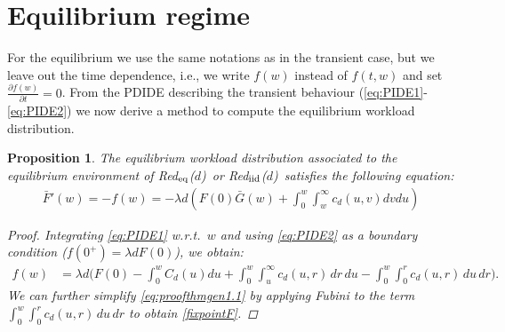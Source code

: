 \documentclass[12pt]{report}
\newcommand{\Redid}{Red$_{\textup{eq}}$($d$)}
\newcommand{\Redind}{Red$_{\textup{iid}}$($d$)}
\newtheorem{proposition}[theorem]{Proposition}
\begin{document}
\section{Equilibrium regime}\label{sec:equil_Redd}
For the equilibrium we use the same notations as in the transient case, but we leave out the time dependence, i.e., we write $f(w)$ instead of $f(t,w)$ and set $\frac{\partial f(w)}{\partial t} = 0$. From the PDIDE describing the transient behaviour (\ref{eq:PIDE1}-\ref{eq:PIDE2}) we now derive a method to compute the equilibrium workload distribution.
\begin{proposition}\label{thm:gen1}
The equilibrium workload distribution associated to the equilibrium environment of \Redid\ or \Redind\ satisfies the following equation:
\begin{align}
\bar{F}'(w)
=-f(w)
= - \lambda d \left( F(0) \bar{G}(w) + \int_0^w \int_w^\infty c_d(u,v) dv du \right) \label{fixpointF}
\end{align}
\begin{proof}
Integrating \eqref{eq:PIDE1} w.r.t.~$w$ and using \eqref{eq:PIDE2} as a boundary condition ($f(0^+)=\lambda d F(0)$), we obtain:
\begin{align}
f(w)
&= \lambda d \bigg( F(0) - \int_0^w C_d(u) du + \int_0^w \int_u^\infty c_d(u,r)\, dr\, du - \int_0^w \int_0^r c_d(u,r) \, du\, dr \bigg) . \label{eq:proofthmgen1.1}
\end{align}
We can further simplify \eqref{eq:proofthmgen1.1} by applying Fubini to the term $\int_0^w \int_0^r c_d(u,r)\, du\, dr$ to obtain \eqref{fixpointF}.
\end{proof}
\end{proposition}
\end{document}
